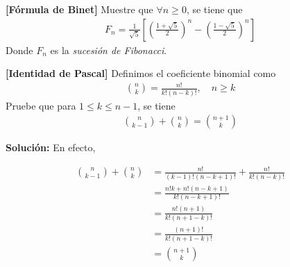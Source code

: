 \documentclass[12pt]{book}
\begin{document}
\begin{prob}
    \textbf{[Fórmula de Binet]} Muestre que $\forall n \geq 0$, se tiene que 
    \begin{align*}
        F_n=\frac{1}{\sqrt{5}}\left[\left(\frac{1+\sqrt{5}}{2} \right)^n-\left(\frac{1-\sqrt{5}}{2} \right)^n \right]
    \end{align*}
    Donde $F_n$ es la \emph{sucesión de Fibonacci}.
\end{prob}

\begin{prob}{}{}
    \textbf{[Identidad de Pascal]}
    Definimos el coeficiente binomial como 
    \begin{align*}
        \binom{n}{k}=\frac{n!}{k!(n-k)!}, \quad n\geq k
    \end{align*}
    Pruebe que para $1 \leq k \leq n-1$, se tiene 
    \begin{align*}
         \binom{n}{k-1}+\binom{n}{k}=\binom{n+1}{k}
    \end{align*}
\end{prob}
\textbf{Solución:}
En efecto,

\begin{align*}
    \binom{n}{k-1}+\binom{n}{k}&=\frac{n!}{(k-1)!(n-k+1)!}+\frac{n!}{k!(n-k)!} \\
    &=\frac{n!k+ n!(n-k+1)}{k!(n-k+1)!}\\
    &=\frac{n!(n+1)}{k!(n+1-k)!} \\
    &=\frac{(n+1)!}{k!(n+1-k)!} \\
    &= \binom{n+1}{k}
\end{align*}
\end{document}
